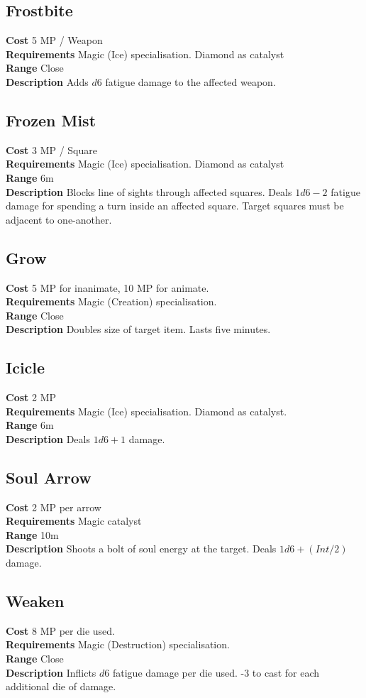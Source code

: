 \subsection*{Frostbite}
\textbf{Cost} 5 MP / Weapon\\
\textbf{Requirements} Magic (Ice) specialisation.
Diamond as catalyst\\
\textbf{Range} Close\\
\textbf{Description} Adds $d6$ fatigue damage to the affected weapon.

\subsection*{Frozen Mist} 
\textbf{Cost} 3 MP / Square\\
\textbf{Requirements} Magic (Ice) specialisation. 
Diamond as catalyst\\
\textbf{Range} 6m\\
\textbf{Description} Blocks line of sights through affected squares. 
Deals $1d6-2$ fatigue damage for spending a turn inside an affected square.
Target squares must be adjacent to one-another.

\subsection*{Grow}
\textbf{Cost} 5 MP for inanimate, 10 MP for animate.\\
\textbf{Requirements} Magic (Creation) specialisation. \\
\textbf{Range} Close\\
\textbf{Description} Doubles size of target item. 
Lasts five minutes.

\subsection*{Icicle}
\textbf{Cost} 2 MP\\
\textbf{Requirements} Magic (Ice) specialisation. 
Diamond as catalyst.\\
\textbf{Range} 6m\\
\textbf{Description} Deals $1d6+1$ damage.

\subsection*{Soul Arrow}
\textbf{Cost} 2 MP per arrow\\
\textbf{Requirements} Magic catalyst\\
\textbf{Range} 10m\\
\textbf{Description} Shoots a bolt of soul energy at the target.
Deals $1d6 + (Int / 2)$ damage.

\subsection*{Weaken}
\textbf{Cost} 8 MP per die used.\\
\textbf{Requirements} Magic (Destruction) specialisation.\\
\textbf{Range} Close\\
\textbf{Description} Inflicts $d6$ fatigue damage per die used. 
-3 to cast for each additional die of damage.

